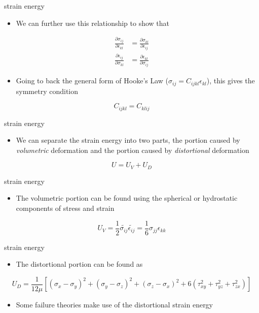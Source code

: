 \documentclass[
  letterpaper,
  ignorenonframetext,
  aspectratio=43,
  handout,
  12pt]{beamer}
\providecommand{\tightlist}{%
  \setlength{\itemsep}{0pt}\setlength{\parskip}{0pt}}
\providecommand{\tightlist}{%
\setlength{\itemsep}{0pt}\setlength{\parskip}{0pt}}
\begin{document}
\begin{frame}{strain energy}
\protect\hypertarget{strain-energy-14}{}
\begin{itemize}
\tightlist
\item
  We can further use this relationship to show that
\end{itemize}

\[\begin{aligned}
    \frac{\partial \sigma_{ij}}{\partial \epsilon_{kl}} &= \frac{\partial \sigma_{kl}}{\partial \epsilon_{ij}}\\
    \frac{\partial \epsilon_{ij}}{\partial \sigma_{kl}} &= \frac{\partial \epsilon_{kl}}{\partial \sigma_{ij}}
\end{aligned}\]

\begin{itemize}
\tightlist
\item
  Going to back the general form of Hooke's Law
  (\(\sigma_{ij} = C_{ijkl}\epsilon_{kl}\)), this gives the symmetry
  condition
\end{itemize}

\[C_{ijkl} = C_{klij}\]
\end{frame}

\begin{frame}{strain energy}
\protect\hypertarget{strain-energy-15}{}
\begin{itemize}
\tightlist
\item
  We can separate the strain energy into two parts, the portion caused
  by \emph{volumetric} deformation and the portion caused by
  \emph{distortional} deformation
\end{itemize}

\[U = U_V + U_D\]
\end{frame}

\begin{frame}{strain energy}
\protect\hypertarget{strain-energy-16}{}
\begin{itemize}
\tightlist
\item
  The volumetric portion can be found using the spherical or hydrostatic
  components of stress and strain
\end{itemize}

\[U_V = \frac{1}{2} \tilde{\sigma_{ij}} \tilde{\epsilon_{ij}} = \frac{1}{6}\sigma_{jj} \epsilon_{kk}\]
\end{frame}

\begin{frame}{strain energy}
\protect\hypertarget{strain-energy-17}{}
\begin{itemize}
\tightlist
\item
  The distortional portion can be found as
\end{itemize}

\[U_D = \frac{1}{12\mu} \left[(\sigma_x - \sigma_y)^2 + (\sigma_y - \sigma_z)^2 + (\sigma_z-\sigma_x)^2 + 6(\tau_{xy}^2 + \tau_{yz}^2 + \tau_{zx}^2)\right]\]

\begin{itemize}
\tightlist
\item
  Some failure theories make use of the distortional strain energy
\end{itemize}
\end{frame}
\end{document}
